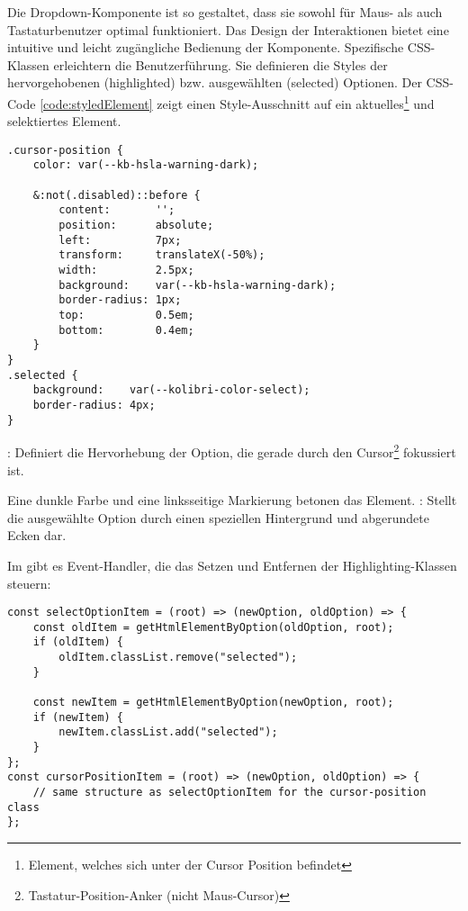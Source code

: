 Die Dropdown-Komponente ist so gestaltet, dass sie sowohl für Maus- als auch Tastaturbenutzer optimal funktioniert. 
Das Design der Interaktionen bietet eine intuitive und leicht zugängliche Bedienung der Komponente. 
Spezifische CSS-Klassen erleichtern die Benutzerführung. 
Sie definieren die Styles der hervorgehobenen (highlighted) bzw. ausgewählten (selected) Optionen. 
Der CSS-Code \ref{code:styledElement} zeigt einen Style-Ausschnitt auf ein aktuelles\footnote{
    Element, welches sich unter der Cursor Position befindet
} und selektiertes Element. 

\begin{lstlisting}[style = htmlcssjs, caption = Aktuelle (\codestyle{cursor-position}) und ausgewählte (\codestyle{selected}) Option, label = code:styledElement]
.cursor-position {
    color: var(--kb-hsla-warning-dark);

    &:not(.disabled)::before {
        content:       '';
        position:      absolute;
        left:          7px;
        transform:     translateX(-50%);
        width:         2.5px;
        background:    var(--kb-hsla-warning-dark);
        border-radius: 1px;
        top:           0.5em;
        bottom:        0.4em;
    }
}
.selected {
    background:    var(--kolibri-color-select);
    border-radius: 4px;
}
\end{lstlisting}

: Definiert die Hervorhebung der Option, die gerade durch den Cursor\footnote{
    Tastatur-Position-Anker (nicht Maus-Cursor)
} fokussiert ist. 

Eine dunkle Farbe und eine linksseitige Markierung betonen das Element. 
: Stellt die ausgewählte Option durch einen speziellen Hintergrund und abgerundete Ecken dar. 

Im  gibt es Event-Handler, die das Setzen und Entfernen der Highlighting-Klassen steuern:

\begin{lstlisting}[style = htmlcssjs, caption = Steuerung der Highlighting-Klassen, label = code:highlightChange]
const selectOptionItem = (root) => (newOption, oldOption) => {
    const oldItem = getHtmlElementByOption(oldOption, root);
    if (oldItem) {
        oldItem.classList.remove("selected");
    }

    const newItem = getHtmlElementByOption(newOption, root);
    if (newItem) {
        newItem.classList.add("selected");
    }
}; 
const cursorPositionItem = (root) => (newOption, oldOption) => {
    // same structure as selectOptionItem for the cursor-position class
}; 
\end{lstlisting}

